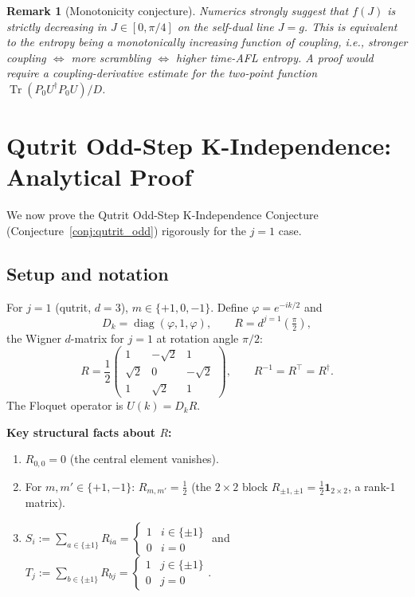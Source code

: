 \documentclass[12pt,a4paper]{article}
\newtheorem{remark}[theorem]{Remark}
\begin{document}
\begin{remark}[Monotonicity conjecture]
Numerics strongly suggest that $f(J)$ is strictly decreasing in $J\in[0,\pi/4]$
on the self-dual line $J=g$.  This is equivalent to the entropy being
a monotonically increasing function of coupling, i.e., stronger coupling
$\Leftrightarrow$ more scrambling $\Leftrightarrow$ higher time-AFL entropy.
A proof would require a coupling-derivative estimate for the two-point
function $\operatorname{Tr}(P_0 U^{\dagger}P_0 U)/D$.
\end{remark}

\section{Qutrit Odd-Step K-Independence: Analytical Proof}
\label{sec:qutrit_proof}

We now prove the Qutrit Odd-Step K-Independence Conjecture
(Conjecture~\ref{conj:qutrit_odd}) rigorously for the $j=1$ case.

\subsection{Setup and notation}

For $j=1$ (qutrit, $d=3$), $m\in\{+1,0,-1\}$.  Define
$\varphi=e^{-ik/2}$ and
\[
  D_k = \operatorname{diag}(\varphi,1,\varphi),\qquad
  R = d^{j=1}\!\left(\tfrac\pi2\right),
\]
the Wigner $d$-matrix for $j=1$ at rotation angle $\pi/2$:
\begin{equation}\label{eq:R_explicit}
R = \frac{1}{2}\begin{pmatrix}
1 & -\sqrt{2} & 1 \\
\sqrt{2} & 0 & -\sqrt{2} \\
1 & \sqrt{2} & 1
\end{pmatrix},\qquad
R^{-1}=R^{\top}=R^{\dagger}.
\end{equation}
The Floquet operator is $U(k) = D_k R$.

\textbf{Key structural facts about $R$:}
\begin{enumerate}
\item $R_{0,0}=0$ (the central element vanishes).
\item For $m,m'\in\{+1,-1\}$: $R_{m,m'}=\tfrac12$ (the $2\times 2$ block
      $R_{\pm1,\pm1} = \tfrac12\mathbf{1}_{2\times 2}$, a rank-1 matrix).
\item $S_i := \sum_{a\in\{\pm1\}} R_{ia} = \begin{cases}1 & i\in\{\pm1\}\\ 0 & i=0\end{cases}$
      and $T_j := \sum_{b\in\{\pm1\}} R_{bj} = \begin{cases}1 & j\in\{\pm1\}\\ 0 & j=0\end{cases}$.
\end{enumerate}
\end{document}
